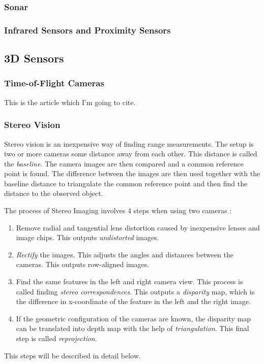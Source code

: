 \subsubsection{Sonar}


\subsubsection{Infrared Sensors and Proximity Sensors}


\subsection{3D Sensors}


\subsubsection{Time-of-Flight Cameras}
This is the article which I'm going to cite. \cite{sr3000}



\subsubsection{Stereo Vision}
Stereo vision is an inexpensive way of finding range measurements. The setup is two or
more cameras some distance away from each other. This distance is called the
\emph{baseline}. The camera images are then compared and a common reference point is
found. The difference between the images are then used together with the baseline distance
to triangulate the common reference point and then find the distance to the observed
object. 

The process of Stereo Imaging involves 4 steps when using two cameras \cite{openCV}:
\begin{enumerate}
    \item Remove radial and tangential lens distortion caused by inexpensive lenses and
        image chips. This outputs \emph{undistorted} images. 
    \item \emph{Rectify} the images. This adjusts the angles and distances between the cameras.
        This outputs row-aligned images.
    \item Find the same features in the left and right camera view. This process is called
        finding \emph{stereo correspondences}. This outputs a \emph{disparity} map, which
        is the difference in x-coordinate of the feature in the left and the right image. 
    \item If the geometric configuration of the cameras are known, the disparity map can
        be translated into depth map with the help of \emph{triangulation}. This final
        step is called \emph{reprojection}.
\end{enumerate}
This steps will be described in detail below. 



